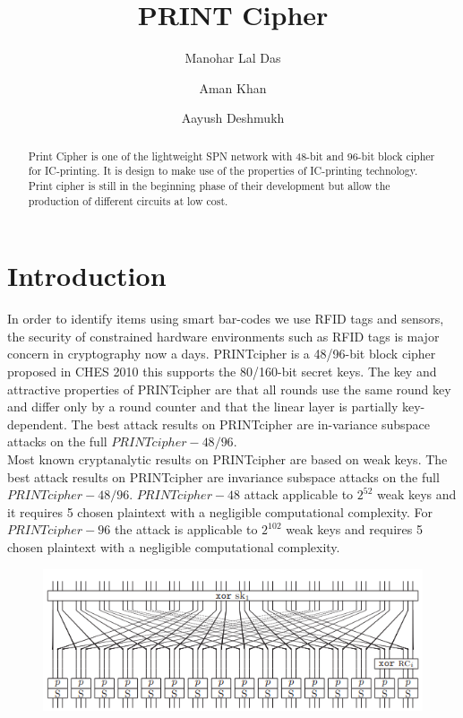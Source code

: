 \documentclass[journal=tosc,preprint]{iacrtrans}
\author{Manohar Lal Das \and Aman Khan \and Aayush Deshmukh}
\institute{
  IIT Bhilai, Raipur, India, \email{manoharlal@iitbhilai.ac.in}
  \and
  IIT Bhilai, Raipur, India, \email{amankhan@iitbhilai.ac.in}
  \and
  IIT Bhilai, Raipur, India, \email{aayushd@iitbhilai.ac.in}
}
\title{PRINT Cipher}
\begin{document}
\maketitle




\begin{abstract}
  Print Cipher is one of the lightweight SPN network with 48-bit and 96-bit block cipher for IC-printing. It is design to make use of the properties of IC-printing technology. Print cipher is still in the beginning phase of their development but allow the production of different circuits at low cost.
\end{abstract}


\section{Introduction}

In order to identify items using smart bar-codes we use RFID tags and sensors, the security of constrained hardware environments such as RFID tags is major concern in cryptography now a days. PRINTcipher is a 48/96-bit block cipher proposed in CHES 2010 this supports the 80/160-bit secret keys. The key and attractive properties of PRINTcipher are that all rounds use the same round key and differ only by a round counter and that the linear layer is partially key-dependent. The best attack results on PRINTcipher are in-variance subspace attacks on the full \(PRINTcipher-48/96\).\\

Most known cryptanalytic results on PRINTcipher are based on weak keys. The best attack results on PRINTcipher are invariance subspace attacks on the full \(PRINTcipher-48/96\). \(PRINTcipher-48\) attack applicable to \(2^{52}\) weak keys and it requires 5 chosen plaintext with a negligible computational complexity. For \(PRINTcipher-96\) the attack is applicable to \(2^{102}\) weak keys and requires 5 chosen plaintext with a negligible computational complexity.

\begin{figure}[h]
	\includegraphics[width=\linewidth]{pics/printcipher.png}
\end{figure}
\end{document}
